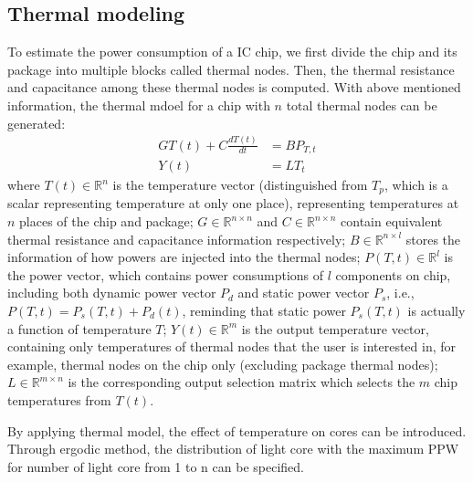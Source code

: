 \subsection{Thermal modeling}
To estimate the power consumption of a IC chip, we first divide the chip and its package into multiple blocks called thermal nodes. Then, the thermal resistance and capacitance among these thermal nodes is computed. With above mentioned information, the thermal mdoel for a chip with $n$ total thermal nodes can be generated:
\begin{equation}\label{gt=bp}
\begin{split}
GT(t) + C\frac{dT(t)}{dt} &= BP_{T,t}\\
Y(t) &= LT_{t}
\end{split}
\end{equation}
where $T(t) \in \mathbb{R}^n$ is the temperature vector (distinguished from $T_p$, which is a scalar representing temperature at only one place), representing temperatures at $n$ places of the chip and package; $G \in \mathbb{R}^{n\times n}$ and  $C \in \mathbb{R}^{n \times n}$ contain equivalent thermal resistance and capacitance information respectively; $B \in \mathbb{R}^{n \times l}$ stores the information of how powers are injected into the thermal nodes; $P(T, t) \in \mathbb{R}^{l}$ is the power vector, which contains power consumptions of $l$ components on chip, including both dynamic power vector $P_d$ and static power vector $P_s$, i.e., $P(T, t)=P_s(T, t)+P_d(t)$, reminding that static power $P_s(T, t)$ is actually a function of temperature $T$;  $Y(t) \in \mathbb{R}^m$ is the output temperature vector, containing only temperatures of thermal nodes that the user is interested in, for example, thermal nodes on the chip only (excluding package thermal nodes); $L \in \mathbb{R}^{m \times n}$ is the corresponding output selection matrix which selects the $m$ chip temperatures from $T(t)$.

By applying thermal model, the effect of temperature on cores can be introduced. 
Through ergodic method, the distribution of light core with the maximum PPW
for number of light core from 1 to n can be specified.




